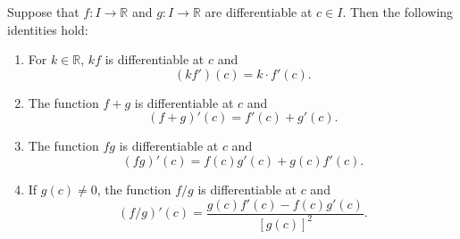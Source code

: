 \documentclass{article}
\begin{document}
\begin{theorem}
	Suppose that \(f:I\rightarrow\mathbb{R}\) and \(g:I\rightarrow\mathbb{R}\) are differentiable at \(c\in I\). Then the following identities hold:
	\begin{enumerate}
		\item For \(k\in\mathbb{R}\), \(kf\) is differentiable at \(c\) and
			\begin{equation*}
				(kf')(c)=k\cdot f'(c).
			\end{equation*}
		\item The function \(f+g\) is differentiable at \(c\) and
			\begin{equation*}
				(f+g)'(c)=f'(c)+g'(c).
			\end{equation*}
		\item The function \(fg\) is differentiable at \(c\) and
			\begin{equation*}
				(fg)'(c)=f(c)g'(c)+g(c)f'(c).
			\end{equation*}
		\item If \(g(c)\neq 0\), the function \(f/g\) is differentiable at \(c\) and
			\begin{equation*}
				(f/g)'(c)=\frac{g(c)f'(c)-f(c)g'(c)}{[g(c)]^2}.
			\end{equation*}
	\end{enumerate}
\end{theorem}
\end{document}
